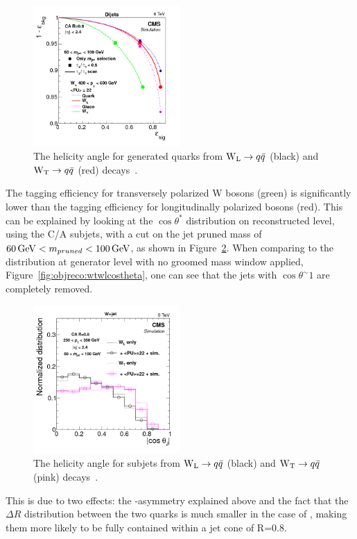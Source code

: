 \begin{figure}[h!] 
    \centering 
    \includegraphics[width=0.5\textwidth]{figures/event_reconstruction/substructure_pas_roc3b.png}
     \caption{The helicity angle for generated quarks from $\mathrm{W}_{\mathrm{L}}\rightarrow q\bar{q}$ (black) and $\mathrm{W}_{\mathrm{T}}\rightarrow q\bar{q}$ (red) decays~\cite{Khachatryan:2014vla}.}
     \label{fig:objreco:wtwleff}
 \end{figure}

The tagging efficiency for transversely polarized W bosons (green) is significantly lower than the tagging efficiency for longitudinally polarized bosons (red). This can be explained by looking at the  $\cos \theta^*$ distribution on reconstructed level, using the C/A subjets, with a cut on the jet pruned mass of $60 \,\text{Ge\hspace{-.08em}V} < m_{pruned} < 100 \,\text{Ge\hspace{-.08em}V}$, as shown in Figure~\ref{fig:objreco:wtwlcostheta_reco}. When comparing to the distribution at generator level with no groomed mass window applied, Figure~\ref{fig:objreco:wtwlcostheta}, one can see that the \PWT jets with $\cos \theta^ \sim 1$ are completely removed.
\begin{figure}[h!] 
    \centering 
    \includegraphics[width=0.5\textwidth]{figures/event_reconstruction/s1vs2-600_sjCosTheta_afterMass.png}
     \caption{The helicity angle for subjets from $\mathrm{W}_{\mathrm{L}}\rightarrow q\bar{q}$ (black) and $\mathrm{W}_{\mathrm{T}}\rightarrow q\bar{q}$ (pink) decays~\cite{Khachatryan:2014vla}.}
     \label{fig:objreco:wtwlcostheta_reco}
 \end{figure}
 This is due to two effects: the \PT-asymmetry explained above and the fact that the $\Delta R$ distribution between the two quarks is much smaller in the case of \PWL, making them more likely to be fully contained within a jet cone of R=0.8.

